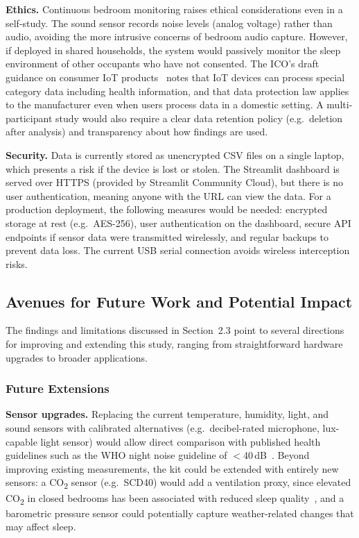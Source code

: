 \documentclass[10pt,a4paper]{extarticle}
\begin{document}
\textbf{Ethics.} Continuous bedroom monitoring raises ethical considerations even in a self-study. The sound sensor records noise levels (analog voltage) rather than audio, avoiding the more intrusive concerns of bedroom audio capture. However, if deployed in shared households, the system would passively monitor the sleep environment of other occupants who have not consented. The ICO's draft guidance on consumer IoT products~\citep{ico2025iot} notes that IoT devices can process special category data including health information, and that data protection law applies to the manufacturer even when users process data in a domestic setting. A multi-participant study would also require a clear data retention policy (e.g.\ deletion after analysis) and transparency about how findings are used.

\textbf{Security.} Data is currently stored as unencrypted CSV files on a single laptop, which presents a risk if the device is lost or stolen. The Streamlit dashboard is served over HTTPS (provided by Streamlit Community Cloud), but there is no user authentication, meaning anyone with the URL can view the data. For a production deployment, the following measures would be needed: encrypted storage at rest (e.g.\ AES-256), user authentication on the dashboard, secure API endpoints if sensor data were transmitted wirelessly, and regular backups to prevent data loss. The current USB serial connection avoids wireless interception risks.

\subsection{Avenues for Future Work and Potential Impact}

The findings and limitations discussed in Section~2.3 point to several directions for improving and extending this study, ranging from straightforward hardware upgrades to broader applications.

\subsubsection{Future Extensions}

\textbf{Sensor upgrades.} Replacing the current temperature, humidity, light, and sound sensors with calibrated alternatives (e.g.\ decibel-rated microphone, lux-capable light sensor) would allow direct comparison with published health guidelines such as the WHO night noise guideline of $<$40\,dB~\citep{who2009}. Beyond improving existing measurements, the kit could be extended with entirely new sensors: a CO\textsubscript{2} sensor (e.g.\ SCD40) would add a ventilation proxy, since elevated CO\textsubscript{2} in closed bedrooms has been associated with reduced sleep quality~\citep{basner2023, caddick2018}, and a barometric pressure sensor could potentially capture weather-related changes that may affect sleep.
\end{document}

